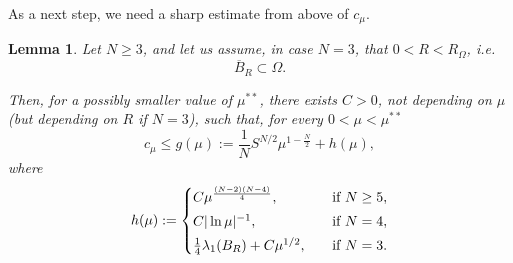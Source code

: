\documentclass[10pt]{article}
\newtheorem{lemma}[proposition]{Lemma}
\theoremstyle{definition}
\numberwithin{equation}{section}
\begin{document}
As a next step, we need a sharp estimate from above of $c_\mu$.
%
\begin{lemma}\label{energy:mp}
Let $N\ge3$, and let us assume, in case $N=3$, that $0<R<R_\Omega$, i.e. 
\[
\overline{B}_R\subset\Omega.
\]

Then, for a possibly smaller value of $\mu^{**}$, there exists $C>0$, not depending on $\mu$ (but 
depending on $R$ if $N=3$), such that, for every $0<\mu<\mu^{**}$
\begin{equation}\label{eq:mpfromabove}
c_{\mu}\leq
g(\mu):= \frac{1}{N}S^{N/2}\mu^{1-\frac{N}{2}}+ h(\mu),
\end{equation}
where
\begin{equation}\label{eq:mpfromabove_h}
    \begin{aligned}\displaystyle
h(\mu):=
\begin{cases}
C\mu^{\frac{(N-2)(N-4)}{4}}, \ \ \ &\mbox{if} \ N\geq5,
\smallskip\\
C|\ln \mu|^{-1}, \ \ \ &\mbox{if} \ N=4,
\smallskip\\
\frac{1}{4}\lambda_{1}(B_{R})+C\mu^{1/2}, \ \ \ &\mbox{if} \ N=3.
\end{cases}
    \end{aligned}
\end{equation}
\end{lemma}
\end{document}
